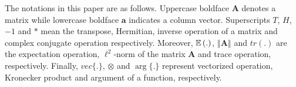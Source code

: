 The notations in this paper are as follows. Uppercase boldface $\mathbf{A}$ denotes a matrix while lowercase
boldface $\mathbf{a}$ indicates a column vector.
Superscripts $T$, $H$, $-1$ and $*$ mean the transpose, Hermitian, inverse operation of a matrix and complex conjugate operation respectively. Moreover, $\operatorname{\mathbb{E}}{(.)}$, $\left\Vert\mathbf{A}\right\Vert$ and $tr(.)$ are the expectation operation, $\ell^2$-norm of the matrix $\mathbf{A}$ and trace operation, respectively. Finally, $vec\{.\}$, $\otimes$ and $\arg\{.\}$ represent vectorized operation, Kronecker product and argument of a function, respectively.  


